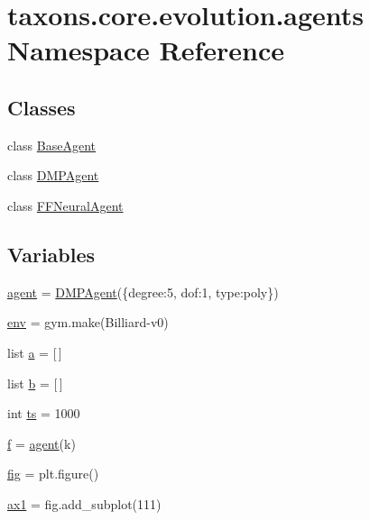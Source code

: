 \hypertarget{namespacetaxons_1_1core_1_1evolution_1_1agents}{}\section{taxons.\+core.\+evolution.\+agents Namespace Reference}
\label{namespacetaxons_1_1core_1_1evolution_1_1agents}
\subsection*{Classes}
\begin{DoxyCompactItemize}
\item 
class \hyperlink{classtaxons_1_1core_1_1evolution_1_1agents_1_1_base_agent}{Base\+Agent}
\item 
class \hyperlink{classtaxons_1_1core_1_1evolution_1_1agents_1_1_d_m_p_agent}{D\+M\+P\+Agent}
\item 
class \hyperlink{classtaxons_1_1core_1_1evolution_1_1agents_1_1_f_f_neural_agent}{F\+F\+Neural\+Agent}
\end{DoxyCompactItemize}
\subsection*{Variables}
\begin{DoxyCompactItemize}
\item 
\hyperlink{namespacetaxons_1_1core_1_1evolution_1_1agents_a589089f38a7adde0389093ecdc99ed74}{agent} = \hyperlink{classtaxons_1_1core_1_1evolution_1_1agents_1_1_d_m_p_agent}{D\+M\+P\+Agent}(\{\textquotesingle{}degree\textquotesingle{}\+:5, \textquotesingle{}dof\textquotesingle{}\+:1, \textquotesingle{}type\textquotesingle{}\+:\textquotesingle{}poly\textquotesingle{}\})
\item 
\hyperlink{namespacetaxons_1_1core_1_1evolution_1_1agents_a545a5a7461da56f28c14c0d87dcf4d65}{env} = gym.\+make(\textquotesingle{}Billiard-\/v0\textquotesingle{})
\item 
list \hyperlink{namespacetaxons_1_1core_1_1evolution_1_1agents_a97819a12f14cfc87de2cdbc971c00bc7}{a} = \mbox{[}$\,$\mbox{]}
\item 
list \hyperlink{namespacetaxons_1_1core_1_1evolution_1_1agents_a00570c7d448ddcbb5922aeefbf43710f}{b} = \mbox{[}$\,$\mbox{]}
\item 
int \hyperlink{namespacetaxons_1_1core_1_1evolution_1_1agents_aa20d7466126919c8ef7bd33634956d85}{ts} = 1000
\item 
\hyperlink{namespacetaxons_1_1core_1_1evolution_1_1agents_a6dbaf8f9be317363f4f7a0fc5f8573d5}{f} = \hyperlink{namespacetaxons_1_1core_1_1evolution_1_1agents_a589089f38a7adde0389093ecdc99ed74}{agent}(k)
\item 
\hyperlink{namespacetaxons_1_1core_1_1evolution_1_1agents_acae5f14891d95eac84ff49d8d39093a4}{fig} = plt.\+figure()
\item 
\hyperlink{namespacetaxons_1_1core_1_1evolution_1_1agents_aa4a5576b82bee8c8dd496b863356338e}{ax1} = fig.\+add\+\_\+subplot(111)
\end{DoxyCompactItemize}


